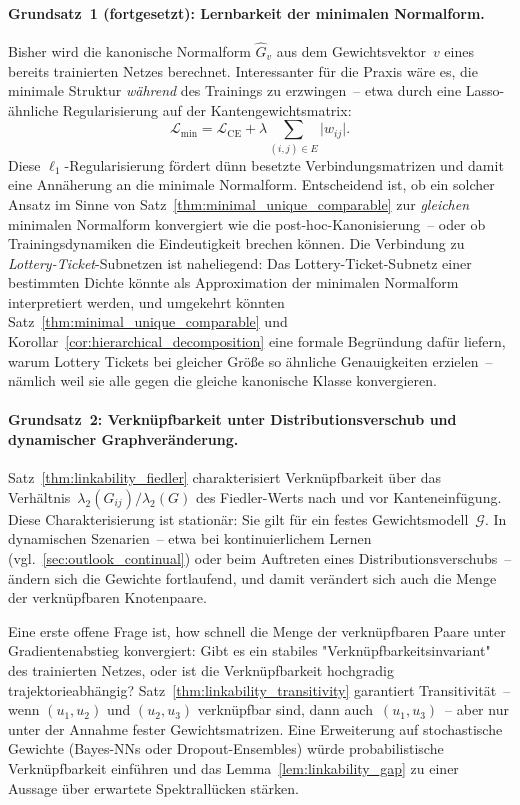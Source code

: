 \documentclass[12pt, a4paper, openany]{report}
\newcommand{\calG}{\mathcal{G}}
\newcommand{\calL}{\mathcal{L}}
\begin{document}
\paragraph{Grundsatz~1 (fortgesetzt): Lernbarkeit der minimalen Normalform.}
Bisher wird die kanonische Normalform $\hat{G}_v$ aus dem Gewichtsvektor~$v$
eines bereits trainierten Netzes berechnet.  Interessanter für die Praxis
wäre es, die minimale Struktur \textit{während} des Trainings zu erzwingen~--
etwa durch eine Lasso-ähnliche Regularisierung auf der Kantengewichtsmatrix:
\[
  \calL_{\text{min}} = \calL_{\text{CE}} + \lambda \sum_{(i,j)\in E} \bigl|w_{ij}\bigr|.
\]
Diese $\ell_1$-Regularisierung fördert dünn besetzte Verbindungsmatrizen und
damit eine Annäherung an die minimale Normalform.  Entscheidend ist, ob ein
solcher Ansatz im Sinne von Satz~\ref{thm:minimal_unique_comparable} zur
\emph{gleichen} minimalen Normalform konvergiert wie die post-hoc-Kanonisierung~--
oder ob Trainingsdynamiken die Eindeutigkeit brechen können.  Die Verbindung
zu \emph{Lottery-Ticket}-Subnetzen \cite{frankle19} ist naheliegend: Das
Lottery-Ticket-Subnetz einer bestimmten Dichte könnte als Approximation der
minimalen Normalform interpretiert werden, und umgekehrt könnten
Satz~\ref{thm:minimal_unique_comparable} und
Korollar~\ref{cor:hierarchical_decomposition}
eine formale Begründung dafür liefern, warum Lottery Tickets bei gleicher
Größe so ähnliche Genauigkeiten erzielen~-- nämlich weil sie alle gegen die
gleiche kanonische Klasse konvergieren.

\paragraph{Grundsatz~2: Verknüpfbarkeit unter Distributionsverschub und dynamischer Graphveränderung.}
Satz~\ref{thm:linkability_fiedler} charakterisiert Verknüpfbarkeit über das
Verhältnis~$\lambda_2(G_{ij}) / \lambda_2(G)$ des Fiedler-Werts nach und vor
Kanteneinfügung.  Diese Charakterisierung ist stationär: Sie gilt für ein
festes Gewichtsmodell~$\calG$.  In dynamischen Szenarien~-- etwa bei
kontinuierlichem Lernen (vgl.~\cref{sec:outlook_continual}) oder beim
Auftreten eines Distributionsverschubs~-- ändern sich die Gewichte fortlaufend,
und damit verändert sich auch die Menge der verknüpfbaren Knotenpaare.

Eine erste offene Frage ist, how schnell die Menge der verknüpfbaren Paare
unter Gradientenabstieg konvergiert: Gibt es ein stabiles
"Verknüpfbarkeitsinvariant" des trainierten Netzes, oder ist die
Verknüpfbarkeit hochgradig trajektorieabhängig?  Satz~\ref{thm:linkability_transitivity}
garantiert Transitivität~-- wenn $(u_1, u_2)$ und $(u_2, u_3)$ verknüpfbar
sind, dann auch~$(u_1, u_3)$~-- aber nur unter der Annahme fester
Gewichtsmatrizen.  Eine Erweiterung auf stochastische Gewichte (Bayes-NNs
oder Dropout-Ensembles) würde probabilistische Verknüpfbarkeit einführen
und das Lemma~\ref{lem:linkability_gap} zu einer Aussage über erwartete
Spektrallücken stärken.
\end{document}

